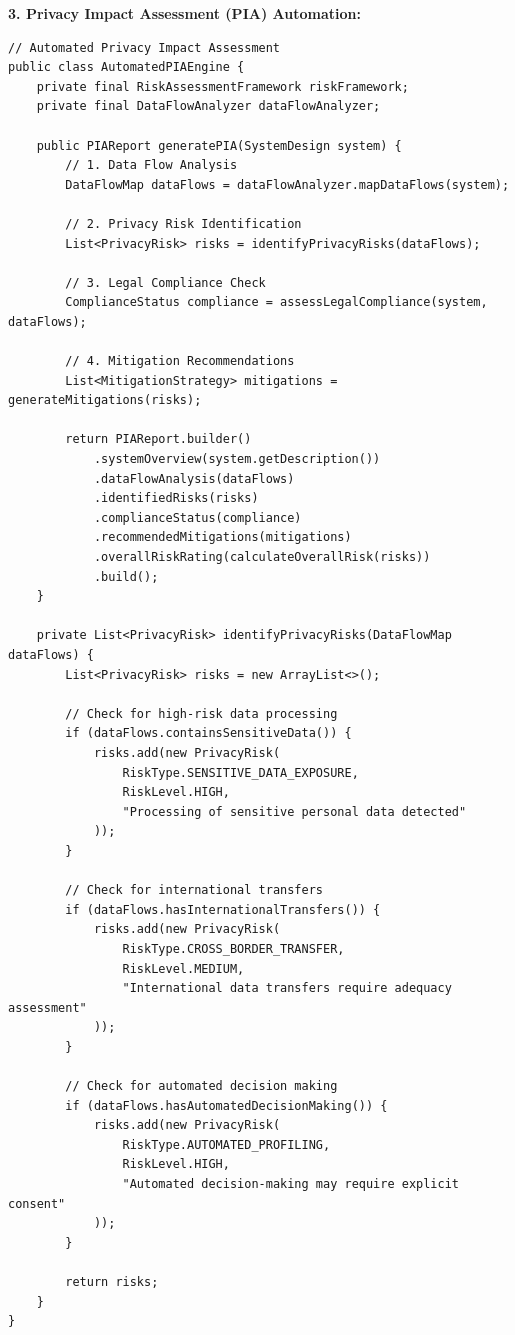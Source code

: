 \textbf{3. Privacy Impact Assessment (PIA) Automation:}
\begin{lstlisting}[breaklines=true,basicstyle=\ttfamily\footnotesize]
// Automated Privacy Impact Assessment
public class AutomatedPIAEngine {
    private final RiskAssessmentFramework riskFramework;
    private final DataFlowAnalyzer dataFlowAnalyzer;
    
    public PIAReport generatePIA(SystemDesign system) {
        // 1. Data Flow Analysis
        DataFlowMap dataFlows = dataFlowAnalyzer.mapDataFlows(system);
        
        // 2. Privacy Risk Identification
        List<PrivacyRisk> risks = identifyPrivacyRisks(dataFlows);
        
        // 3. Legal Compliance Check
        ComplianceStatus compliance = assessLegalCompliance(system, dataFlows);
        
        // 4. Mitigation Recommendations
        List<MitigationStrategy> mitigations = generateMitigations(risks);
        
        return PIAReport.builder()
            .systemOverview(system.getDescription())
            .dataFlowAnalysis(dataFlows)
            .identifiedRisks(risks)
            .complianceStatus(compliance)
            .recommendedMitigations(mitigations)
            .overallRiskRating(calculateOverallRisk(risks))
            .build();
    }
    
    private List<PrivacyRisk> identifyPrivacyRisks(DataFlowMap dataFlows) {
        List<PrivacyRisk> risks = new ArrayList<>();
        
        // Check for high-risk data processing
        if (dataFlows.containsSensitiveData()) {
            risks.add(new PrivacyRisk(
                RiskType.SENSITIVE_DATA_EXPOSURE,
                RiskLevel.HIGH,
                "Processing of sensitive personal data detected"
            ));
        }
        
        // Check for international transfers
        if (dataFlows.hasInternationalTransfers()) {
            risks.add(new PrivacyRisk(
                RiskType.CROSS_BORDER_TRANSFER,
                RiskLevel.MEDIUM,
                "International data transfers require adequacy assessment"
            ));
        }
        
        // Check for automated decision making
        if (dataFlows.hasAutomatedDecisionMaking()) {
            risks.add(new PrivacyRisk(
                RiskType.AUTOMATED_PROFILING,
                RiskLevel.HIGH,
                "Automated decision-making may require explicit consent"
            ));
        }
        
        return risks;
    }
}
\end{lstlisting}

